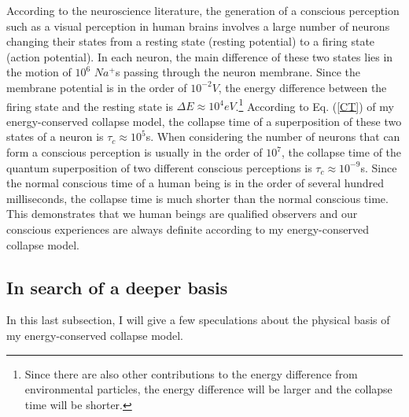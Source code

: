 According to the neuroscience literature, the generation of a conscious perception such as a visual perception in human brains involves a large number of neurons changing their states from a resting state (resting potential) to a firing state (action potential). In each neuron, the main difference of these two states lies in the motion of $10^6$ $Na^+$s passing through the neuron membrane. Since the membrane potential is in the order of $10^{-2}V$, the energy difference between the firing state and the resting state is $\Delta E \approx 10^{4}eV$.\footnote{Since there are also other contributions to the energy difference from environmental particles, the energy difference will be larger and the collapse time will be shorter.} According to Eq. (\ref{CT}) of my energy-conserved collapse model, the collapse time of a  superposition of these two states of a neuron is $\tau_c \approx 10^{5}$s. When considering the number of neurons that can form a  conscious perception is usually in the order of $10^7$, the collapse time of the quantum superposition of two different conscious perceptions is $\tau_c  \approx 10^{-9}$s. Since the normal conscious time of a human being is in the order of several hundred milliseconds, the collapse time is much shorter than the normal conscious time. This demonstrates that we human beings are qualified observers and our conscious experiences are always definite according to my energy-conserved collapse model.

\subsection{In search of a deeper basis}

In this last subsection, I will give a few speculations about the physical basis of my energy-conserved collapse model.

